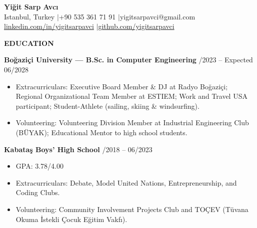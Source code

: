 \documentclass[a4paper]{article}
\newcommand{\sechead}[1]{%
    \vspace{7.5pt}%
    {\centering\fontsize{11}{13}\textbf{\MakeUppercase{#1}}\par}%
    \vspace{3.5pt}%
}
\newcommand{\entry}[2]{%
    {\fontsize{10.5}{13}\textbf{#1}} \hfill {\fontsize{9.5}{12.5}\selectfont #2} \par
}
\newcommand{\desc}[1]{%
    {\fontsize{9.5}{12.5}\selectfont #1}%
}
\begin{document}

{\centering
    {\fontsize{24}{28}\bfseries Yi\u{g}it Sarp Avc\i{}} \\[0.4em]
    {\fontsize{9.5}{12}\selectfont Istanbul, Turkey \enspace$\vert$\enspace +90 535 361 71 91 \enspace$\vert$\enspace yigitsarpavci@gmail.com} \\[0.25em]
    {\fontsize{9.5}{12}\selectfont \href{https://linkedin.com/in/yigitsarpavci}{linkedin.com/in/yigitsarpavci} \enspace$\vert$\enspace \href{https://github.com/yigitsarpavci}{github.com/yigitsarpavci}} \par
}
\vspace{0.25em}

\sechead{Education}

\entry{Bo\u{g}azi\c{c}i University \textnormal{--- B.Sc. in Computer Engineering}}{09/2023 -- Expected 06/2028}
\begin{itemize}[leftmargin=1.1em, itemsep=1.2pt, parsep=0pt, topsep=1.8pt]
    \item \desc{Extracurriculars: Executive Board Member \& DJ at Radyo Bo\u{g}azi\c{c}i; Regional Organizational Team Member at ESTIEM; Work and Travel USA participant; Student-Athlete (sailing, skiing \& windsurfing).}
    \item \desc{Volunteering: Volunteering Division Member at Industrial Engineering Club (B\"{U}YAK); Educational Mentor to high school students.}
\end{itemize}
\vspace{2.5pt}

\entry{Kabata\c{s} Boys' High School}{09/2018 -- 06/2023}
\begin{itemize}[leftmargin=1.1em, itemsep=1.2pt, parsep=0pt, topsep=1.8pt]
    \item \desc{GPA: 3.78/4.00}
    \item \desc{Extracurriculars: Debate, Model United Nations, Entrepreneurship, and Coding Clubs.}
    \item \desc{Volunteering: Community Involvement Projects Club and TO\c{C}EV (T\"{u}vana Okuma \.{I}stekli \c{C}ocuk E\u{g}itim Vakf\i{}).}
\end{itemize}
\end{document}
